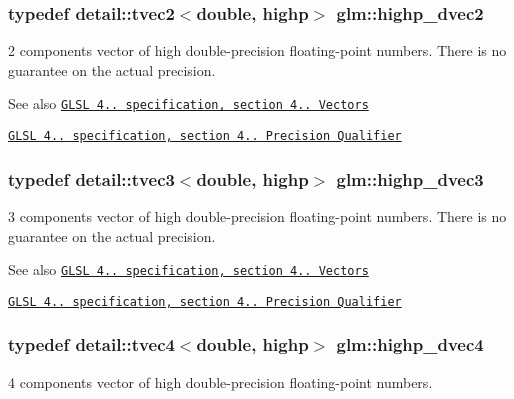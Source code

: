 \subsubsection[{\texorpdfstring{highp\+\_\+dvec2}{highp_dvec2}}]{\setlength{\rightskip}{0pt plus 5cm}typedef detail\+::tvec2$<$double, highp$>$ {\bf glm\+::highp\+\_\+dvec2}}\hypertarget{group__core__precision_gacfbe8512142fff27f0bfb44958c1752f}{}\label{group__core__precision_gacfbe8512142fff27f0bfb44958c1752f}
2 components vector of high double-\/precision floating-\/point numbers. There is no guarantee on the actual precision.

\begin{DoxySeeAlso}{See also}
\href{http://www.opengl.org/registry/doc/GLSLangSpec.4.20.8.pdf}{\tt G\+L\+SL 4.. specification, section 4.. Vectors} 

\href{http://www.opengl.org/registry/doc/GLSLangSpec.4.20.8.pdf}{\tt G\+L\+SL 4.. specification, section 4.. Precision Qualifier} 
\end{DoxySeeAlso}
\subsubsection[{\texorpdfstring{highp\+\_\+dvec3}{highp_dvec3}}]{\setlength{\rightskip}{0pt plus 5cm}typedef detail\+::tvec3$<$double, highp$>$ {\bf glm\+::highp\+\_\+dvec3}}\hypertarget{group__core__precision_ga4962711854156dae8ebb4eb39237c542}{}\label{group__core__precision_ga4962711854156dae8ebb4eb39237c542}
3 components vector of high double-\/precision floating-\/point numbers. There is no guarantee on the actual precision.

\begin{DoxySeeAlso}{See also}
\href{http://www.opengl.org/registry/doc/GLSLangSpec.4.20.8.pdf}{\tt G\+L\+SL 4.. specification, section 4.. Vectors} 

\href{http://www.opengl.org/registry/doc/GLSLangSpec.4.20.8.pdf}{\tt G\+L\+SL 4.. specification, section 4.. Precision Qualifier} 
\end{DoxySeeAlso}
\subsubsection[{\texorpdfstring{highp\+\_\+dvec4}{highp_dvec4}}]{\setlength{\rightskip}{0pt plus 5cm}typedef detail\+::tvec4$<$double, highp$>$ {\bf glm\+::highp\+\_\+dvec4}}\hypertarget{group__core__precision_gad5ff5ff4a69e6925f5b4f540e2633835}{}\label{group__core__precision_gad5ff5ff4a69e6925f5b4f540e2633835}
4 components vector of high double-\/precision floating-\/point numbers.

